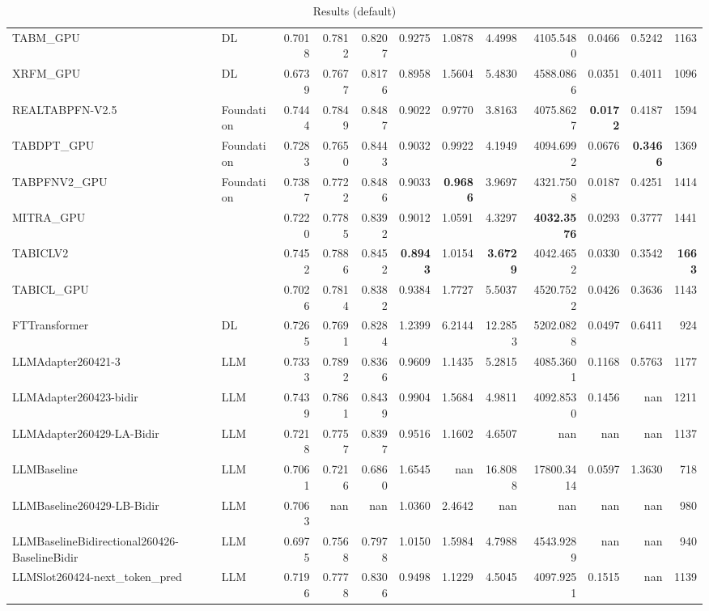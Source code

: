 \begin{table}[htbp]
{\begin{tabular}{ll|rrrrrrrrr|r}
TABM\_GPU & DL & 0.7018 & 0.7812 & 0.8207 & 0.9275 & 1.0878 & 4.4998 & 4105.5480 & 0.0466 & 0.5242 & 1163 \\
XRFM\_GPU & DL & 0.6739 & 0.7677 & 0.8176 & 0.8958 & 1.5604 & 5.4830 & 4588.0866 & 0.0351 & 0.4011 & 1096 \\
REALTABPFN-V2.5 & Foundation & 0.7444 & 0.7849 & 0.8487 & 0.9022 & 0.9770 & 3.8163 & 4075.8627 & \textbf{0.0172} & 0.4187 & 1594 \\
TABDPT\_GPU & Foundation & 0.7283 & 0.7650 & 0.8443 & 0.9032 & 0.9922 & 4.1949 & 4094.6992 & 0.0676 & \textbf{0.3466} & 1369 \\
TABPFNV2\_GPU & Foundation & 0.7387 & 0.7722 & 0.8486 & 0.9033 & \textbf{0.9686} & 3.9697 & 4321.7508 & 0.0187 & 0.4251 & 1414 \\
MITRA\_GPU &  & 0.7220 & 0.7785 & 0.8392 & 0.9012 & 1.0591 & 4.3297 & \textbf{4032.3576} & 0.0293 & 0.3777 & 1441 \\
TABICLV2 &  & 0.7452 & 0.7886 & 0.8452 & \textbf{0.8943} & 1.0154 & \textbf{3.6729} & 4042.4652 & 0.0330 & 0.3542 & \textbf{1663} \\
TABICL\_GPU &  & 0.7026 & 0.7814 & 0.8382 & 0.9384 & 1.7727 & 5.5037 & 4520.7522 & 0.0426 & 0.3636 & 1143 \\
\midrule
FTTransformer & DL & 0.7265 & 0.7691 & 0.8284 & 1.2399 & 6.2144 & 12.2853 & 5202.0828 & 0.0497 & 0.6411 & 924 \\
LLMAdapter260421-3 & LLM & 0.7333 & 0.7892 & 0.8366 & 0.9609 & 1.1435 & 5.2815 & 4085.3601 & 0.1168 & 0.5763 & 1177 \\
LLMAdapter260423-bidir & LLM & 0.7439 & 0.7861 & 0.8439 & 0.9904 & 1.5684 & 4.9811 & 4092.8530 & 0.1456 & nan & 1211 \\
LLMAdapter260429-LA-Bidir & LLM & 0.7218 & 0.7757 & 0.8397 & 0.9516 & 1.1602 & 4.6507 & nan & nan & nan & 1137 \\
LLMBaseline & LLM & 0.7061 & 0.7216 & 0.6860 & 1.6545 & nan & 16.8088 & 17800.3414 & 0.0597 & 1.3630 & 718 \\
LLMBaseline260429-LB-Bidir & LLM & 0.7063 & nan & nan & 1.0360 & 2.4642 & nan & nan & nan & nan & 980 \\
LLMBaselineBidirectional260426-BaselineBidir & LLM & 0.6975 & 0.7568 & 0.7978 & 1.0150 & 1.5984 & 4.7988 & 4543.9289 & nan & nan & 940 \\
LLMSlot260424-next\_token\_pred & LLM & 0.7196 & 0.7778 & 0.8306 & 0.9498 & 1.1229 & 4.5045 & 4097.9251 & 0.1515 & nan & 1139 \\
\bottomrule
\end{tabular}
}
\caption{Results (default)}
\label{tab:results_default}
\end{table}